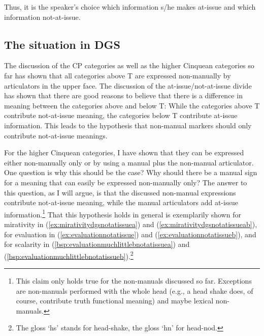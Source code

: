 \noindent Thus, it is the speaker's choice which information s/he makes at-issue and which information not-at-issue. 

\subsection{The situation in DGS}
\largerpage[2]
The discussion of the CP categories as well as the higher Cinquean categories so far has shown that all categories above T are expressed non-manually by articulators in the upper face. The discussion of the at-issue/not-at-issue divide has shown that there are good reasons to believe that there is a difference in meaning between the categories above and below T: While the categories above T contribute not-at-issue meaning, the categories below T contribute at-issue information. This leads to the hypothesis that non-manual markers should only contribute not-at-issue meanings. 

For the higher Cinquean categories, I have shown that they can be expressed either non-manually only or by using a manual plus the non-manual articulator. One question is why this should be the case? Why should there be a manual sign for a meaning that can easily be expressed non-manually only? The answer to this question, as I will argue, is that the discussed non-manual expressions contribute not-at-issue meaning, while the manual articulators add at-issue information.\footnote{ This claim only holds true for the non-manuals discussed so far. Exceptions are non-manuals performed with the whole head (e.g., a head shake does, of course, contribute truth functional meaning) and maybe lexical non-manuals.} That this hypothesis holds in general is exemplarily shown for mirativity in (\ref{ex:mirativitydgsnotatissuea}) and (\ref{ex:mirativitydgsnotatissueab}), for evaluation in (\ref{ex:evaluationnotatissue}) and (\ref{ex:evaluationnotatissueb}), and for scalarity in (\ref{bsp:evaluationmuchlittlebnotatissuea}) and (\ref{bsp:evaluationmuchlittlebnotatissueb}).\footnote{ The gloss `hs' stands for head-shake, the gloss `hn' for head-nod.}


